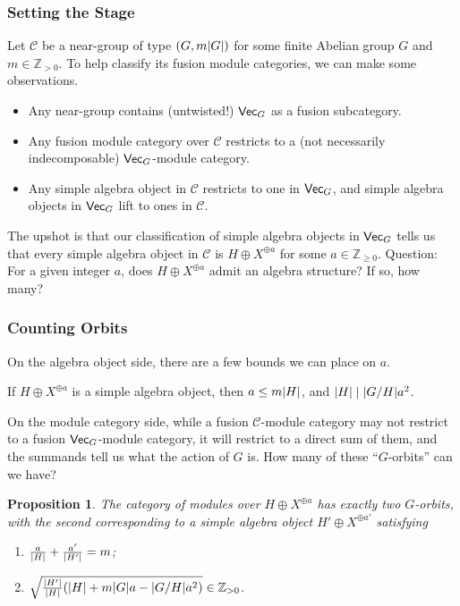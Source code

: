 \documentclass{beamer}
\theoremstyle{plain}
\newtheorem{proposition}[theorem]{Proposition}
\theoremstyle{definition}
\DeclarePairedDelimiter{\abs}{\lvert}{\rvert}
\newcommand{\mathcat}[1]{\mathcal{#1}}
\newcommand{\textcat}[1]{\textup{\textsf{#1}}}
\begin{document}
\begin{frame}
\frametitle{Setting the Stage}
Let $\mathcat{C}$ be a near-group of type $(G, m\abs{G})$ for some finite Abelian group $G$ and $m \in \mathbb{Z}_{>0}$. To help classify its fusion module categories, we can make some observations.
\medskip
\begin{itemize}
	\item Any near-group contains (untwisted!) $\textcat{Vec}_G$ as a fusion subcategory.
	\item Any fusion module category over $\mathcat{C}$ restricts to a (not necessarily indecomposable) $\textcat{Vec}_G$-module category.
	\item Any simple algebra object in $\mathcat{C}$ restricts to one in $\textcat{Vec}_G$, and simple algebra objects in $\textcat{Vec}_G$ lift to ones in $\mathcat{C}$.
\end{itemize}
\medskip
The upshot is that our classification of simple algebra objects in $\textcat{Vec}_G$ tells us that every simple algebra object in $\mathcat{C}$ is $H \oplus X^{\oplus a}$ for some $a \in \mathbb{Z}_{\geq 0}$.%
\newline\newline
Question: For a given integer $a$, does $H \oplus X^{\oplus a}$ admit an algebra structure? If so, how many?
\end{frame}

\begin{frame}
\frametitle{Counting Orbits}
On the algebra object side, there are a few bounds we can place on $a$.
\begin{lemma}
If $H \oplus X^{\oplus a}$ is a simple algebra object, then $a \leq m\abs{H}$, and $\abs{H} \mid \abs{G/H}a^2$.
\end{lemma}
On the module category side, while a fusion $\mathcat{C}$-module category may not restrict to a fusion $\textcat{Vec}_G$-module category, it will restrict to a direct sum of them, and the summands tell us what the action of $G$ is. How many of these ``$G$-orbits'' can we have?
\begin{proposition}
The category of modules over $H \oplus X^{\oplus a}$ has exactly two $G$-orbits, with the second corresponding to a simple algebra object $H' \oplus X^{\oplus a'}$ satisfying
\begin{enumerate}
	\item $\frac{a}{\abs{H}} + \frac{a'}{\abs{H'}} = m$;
	\item $\sqrt{\frac{\abs{H'}}{\abs{H}}(\abs{H} + m\abs{G}a - \abs{G/H}a^2)} \in \mathbb{Z}_{>0}$.
\end{enumerate}
\end{proposition}
\end{frame}
\end{document}
